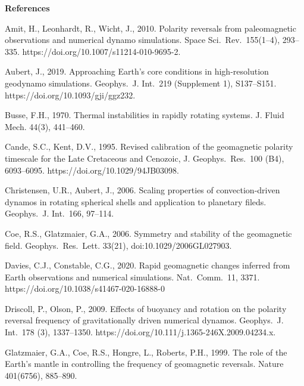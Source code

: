 \bigskip
\noindent
{\bf References}
%
\begin{list}
{}{
\setlength{\parsep}{0pt}
\setlength{\itemsep}{0pt}
\setlength{\leftmargin}{1.0em}
\setlength{\itemindent}{-\leftmargin}
}
\item 
\sloppy
Amit, H., Leonhardt, R., Wicht, J., 2010. Polarity reversals from paleomagnetic observations and numerical dynamo simulations. Space Sci.\ Rev.\ 155(1--4), 293--335. https://doi.org/10.1007/s11214-010-9695-2.
%
\item
\sloppy
Aubert, J., 2019. Approaching Earth's core conditions in high-resolution geodynamo simulations. Geophys.\ J. Int.\ 219 (Supplement 1), S137--S151. https://doi.org/10.1093/gji/ggz232.
%
\item
Busse, F.H., 1970. Thermal instabilities in rapidly rotating systems. J. Fluid Mech. 44(3), 441--460.
%
\item 
Cande, S.C., Kent, D.V., 1995. Revised calibration of the geomagnetic polarity timescale for the Late Cretaceous and Cenozoic, J. Geophys.\ Res.\ 100 (B4), 6093--6095. https://doi.org/10.1029/94JB03098.
%
\item
Christensen, U.R., Aubert, J., 2006. Scaling properties of convection-driven dynamos in rotating spherical shells and application to planetary fileds. Geophys.\ J. Int.\ 166, 97--114.
%
\item
Coe, R.S., Glatzmaier, G.A., 2006. Symmetry and stability of the geomagnetic field. Geophys.\ Res.\ Lett. 33(21), doi:10.1029/2006GL027903.
%
\item
Davies, C.J., Constable, C.G., 2020. Rapid geomagnetic changes inferred from Earth observations and numerical simulations. Nat.\ Comm.\ 11, 3371. https://doi.org/10.1038/s41467-020-16888-0
%
\item
Driscoll, P., Olson, P., 2009. Effects of buoyancy and rotation on the polarity reversal frequency of gravitationally driven numerical dynamos. Geophys.\ J. Int.\ 178 (3), 1337--1350. https://doi.org/10.111/j.1365-246X.2009.04234.x.
%
\item
Glatzmaier, G.A., Coe, R.S., Hongre, L., Roberts, P.H., 1999. The role of the Earth's mantle in controlling the frequency of geomagnetic reversals. Nature 401(6756), 885--890.
%
\item

\end{list}

